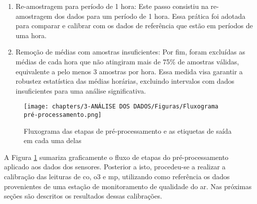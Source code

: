 \begin{enumerate}
    \item Re-amostragem para período de 1 hora: Este passo consistiu na re-amostragem dos dados para um período de 1 hora. Essa prática foi adotada para comparar e calibrar com os dados de referência que estão em períodos de uma hora.
    \item Remoção de médias com amostras insuficientes: Por fim, foram excluídas as médias de cada hora que não atingiram mais de 75\% de amostras válidas, equivalente a pelo menos 3 amostras por hora. Essa medida visa garantir a robustez estatística das médias horárias, excluindo intervalos com dados insuficientes para uma análise significativa.
\end{enumerate}

\begin{figure}[h!]
    \centering
    \caption{Fluxograma das etapas de pré-processamento e as etiquetas de saída em cada uma delas}
    \texttt{[image: chapters/3-ANÁLISE DOS DADOS/Figuras/Fluxograma pré-processamento.png]}
    \label{fig:preprocessing-flow}
\end{figure}

A Figura \ref{fig:preprocessing-flow} sumariza graficamente o fluxo de etapas do pré-processamento aplicado aos dados dos sensores. Posterior a isto, procedeu-se a realizar a calibração das leituras de \acrshort{co}, \acrshort{o3} e \acrshort{mp}, utilizando como referência os dados provenientes de uma estação de monitoramento de qualidade do ar. Nas próximas seções são descritos os resultados dessas calibrações.